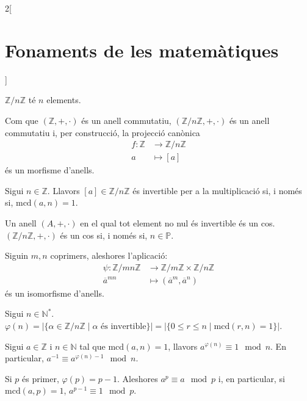 \documentclass[class=article,10pt,crop=false]{standalone}
\begin{document}
\begin{multicols}{2}[\section{Fonaments de les matemàtiques}]
\begin{definition}
\end{definition}
\begin{lemma}
$\mathbb{Z}/n\mathbb{Z}$ té $n$ elements.
\end{lemma}
\begin{theorem}
Com que $(\mathbb{Z},+,\cdot)$ és un anell commutatiu, $(\mathbb{Z}/n\mathbb{Z},+,\cdot)$ és un anell commutatiu i, per construcció, la projecció canònica 
\begin{align*}
    f:\mathbb{Z}&\rightarrow\mathbb{Z}/n\mathbb{Z}\\
    a&\mapsto[a]
\end{align*}és un morfisme d'anells.
\end{theorem}
\begin{lemma}
Sigui $n\in\mathbb{Z}$. Llavors $[a]\in\mathbb{Z}/n\mathbb{Z}$ és invertible per a la multiplicació si, i només si, $\text{mcd}(a,n)=1$.
\end{lemma}
\begin{corollary}
Un anell $(A,+,\cdot)$ en el qual tot element no nul és invertible és un cos. $(\mathbb{Z}/n\mathbb{Z},+,\cdot)$ és un cos si, i només si, $n\in\mathbb{P}$.
\end{corollary}
\begin{theorem}
Siguin $m,n$ coprimers, aleshores l'aplicació:
\begin{align*}
    \psi:\mathbb{Z}/mn\mathbb{Z}&\rightarrow\mathbb{Z}/m\mathbb{Z}\times\mathbb{Z}/n\mathbb{Z}\\
    \overline{a}^{\scriptscriptstyle mn}&\mapsto(\overline{a}^{\scriptscriptstyle m},\overline{a}^{\scriptscriptstyle n})
\end{align*}
és un isomorfisme d'anells.
\end{theorem}
\begin{definition}
Sigui $n\in\mathbb{N}^*$. $\varphi(n)=|\{\alpha\in\mathbb{Z}/n\mathbb{Z}\mid\alpha \text{ és invertible}\}|=|\{0\leq r\leq n\mid \text{mcd}(r,n)=1\}|$.
\end{definition}
\begin{theorem}
Sigui $a\in\mathbb{Z}$ i $n\in\mathbb{N}$ tal que $\text{mcd}(a,n)=1$, llavors $a^{\varphi(n)}\equiv 1\mod n$. En particular, $a^{-1}\equiv a^{\varphi(n)-1}\mod n$.
\end{theorem}
\begin{theorem}
Si $p$ és primer, $\varphi(p)=p-1$. Aleshores $a^p\equiv a\mod p$ i, en particular, si $\text{mcd}(a,p)=1$, $a^{p-1}\equiv 1\mod p$.
\end{theorem}

\end{multicols}
\end{document}
